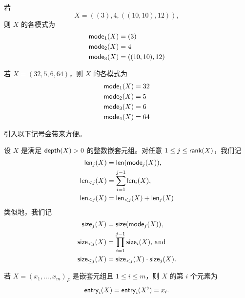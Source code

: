 \begin{example}
    若
    \[X = ((3),4,((10,10),12)),\]
    则 $X$ 的各模式为
    \begin{align*}
        \mathsf{mode}_1(X) & = (3)\\
        \mathsf{mode}_2(X) & = 4 \\
        \mathsf{mode}_3(X) & = ((10,10),12)
    \end{align*}
\end{example}

\begin{example}
    若 $X = (32,5,6,64)$，则 $X$ 的各模式为
    \begin{align*}
        \mathsf{mode}_1(X) & = 32\\
        \mathsf{mode}_2(X) & = 5 \\
        \mathsf{mode}_3(X) & = 6\\
        \mathsf{mode}_4(X) & = 64
    \end{align*}
\end{example}

\noindent 引入以下记号会带来方便。

\begin{notation}
    设 $X$ 是满足 $\mathsf{depth}(X)>0$ 的整数嵌套元组。对任意 $1 \leq j \leq \mathsf{rank}(X)$，我们记
    \begin{align*}
        \mathsf{len}_j(X) & = \mathsf{len}(\mathsf{mode}_j(X))\text{, } \\
        \mathsf{len}_{<j}(X) & = \sum_{i=1}^{j-1} \mathsf{len}_i(X)\text{,}\\
        \mathsf{len}_{\leq j}(X) & = \mathsf{len}_{<j}(X) + \mathsf{len}_j(X)
    \end{align*}
    类似地，我们记
    \begin{align*}
        \mathsf{size}_j(X) & = \mathsf{size}(\mathsf{mode}_j(X))\text{, }\\
        \mathsf{size}_{< j} (X) & = \prod_{i=1}^{j-1} \mathsf{size}_i(X)\text{, and}\\
        \mathsf{size}_{\leq j} (X) & = \mathsf{size}_{<j}(X)\cdot\mathsf{size}_j(X).
    \end{align*}
\end{notation}

\begin{definition}
    \label{definitionofentryofnestedtuple}
    若 $X = (x_1,\dots,x_m)_P$ 是嵌套元组且 $1 \leq i \leq m$，则 $X$ 的第 $i$ 个元素为
    \[
    \mathsf{entry}_i(X) = \mathsf{entry}_i(X^\flat) = x_i.
    \]
\end{definition}


